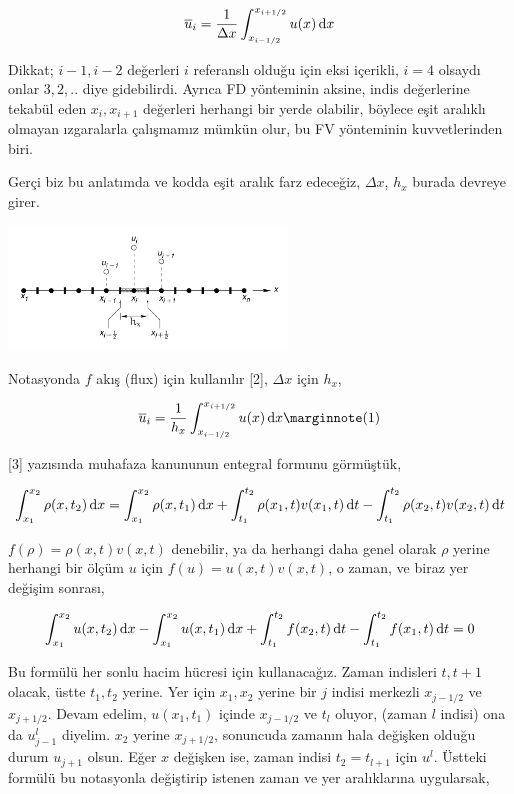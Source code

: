 \documentclass[12pt,fleqn]{article}\usepackage{../../common}
\begin{document}
$$
\overline{u}_i = \frac{1}{\Delta x} \int _{x_{i-1/2}}^{x_{i+1/2}} u(x) \,\mathrm{d} x
$$

Dikkat; $i-1,i-2$ değerleri $i$ referanslı olduğu için eksi içerikli, $i=4$
olsaydı onlar $3,2,..$ diye gidebilirdi. Ayrıca FD yönteminin aksine, indis
değerlerine tekabül eden $x_i,x_{i+1}$ değerleri herhangi bir yerde olabilir,
böylece eşit aralıklı olmayan ızgaralarla çalışmamız mümkün olur, bu FV
yönteminin kuvvetlerinden biri. 

Gerçi biz bu anlatımda ve kodda eşit aralık farz edeceğiz, $\Delta x$, $h_x$
burada devreye girer. 

\includegraphics[width=20em]{12-20-00.png}

Notasyonda $f$ akış (flux) için kullanılır [2], $\Delta x$ için $h_x$,

$$
\overline{u}_i =  \frac{1}{h_x} \int_{x_{i-1/2}}^{x_{i+1/2}} u(x) \ud x
\mlabel{1}
$$

[3] yazısında muhafaza kanununun entegral formunu görmüştük,

$$
\int _{x_1}^{x_2} \rho(x,t_2) \,\mathrm{d} x =
\int _{x_1}^{x_2} \rho(x,t_1) \,\mathrm{d} x  +
\int_{t_1}^{t_2} \rho(x_1,t) v(x_1,t) \,\mathrm{d} t -
\int_{t_1}^{t_2}  \rho(x_2,t) v(x_2,t) \,\mathrm{d} t
$$

$f(\rho) = \rho(x,t) v(x,t)$ denebilir, ya da herhangi daha genel olarak $\rho$
yerine herhangi bir ölçüm $u$ için $f(u) = u(x,t) v(x,t)$, o zaman, ve
biraz yer değişim sonrası,

$$
\int_{x_1}^{x_2} u(x,t_2) \,\mathrm{d} x -
\int_{x_1}^{x_2} u(x,t_1) \,\mathrm{d} x  +
\int_{t_1}^{t_2} f(x_2,t) \,\mathrm{d} t  -
\int_{t_1}^{t_2} f(x_1,t) \,\mathrm{d} t = 0
$$

Bu formülü her sonlu hacim hücresi için kullanacağız. Zaman indisleri $t,t+1$
olacak, üstte $t_1,t_2$ yerine. Yer için $x_1,x_2$ yerine bir $j$ indisi
merkezli $x_{j-1/2}$ ve $x_{j+1/2}$. Devam edelim, $u(x_1,t_1)$ içinde
$x_{j-1/2}$ ve $t_l$ oluyor, (zaman $l$ indisi) ona da $u_{j-1}^l$
diyelim. $x_2$ yerine $x_{j+1/2}$, sonuncuda zamanın hala değişken olduğu durum
$u_{j+1}$ olsun. Eğer $x$ değişken ise, zaman indisi $t_2 = t_{l+1}$ için
$u^{l}$. Üstteki formülü bu notasyonla değiştirip istenen zaman ve yer
aralıklarına uygularsak,
\end{document}
